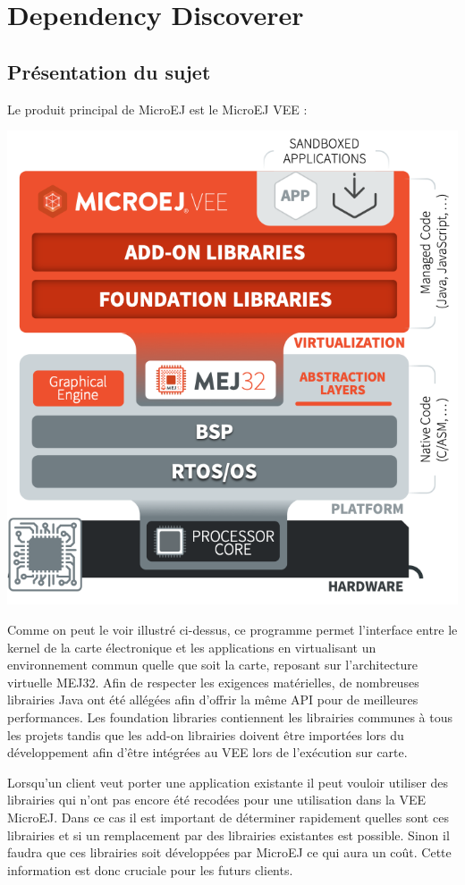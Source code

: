 \documentclass[french,a4paper,12pt]{report}
\begin{document}
\chapter{Dependency Discoverer}

\section{Présentation du sujet}

Le produit principal de MicroEJ est le MicroEJ VEE :

\begin{center}
  \includegraphics[width=.6\textwidth]{ressources/schemas/Implementations-on-hardware_minimize.png}
\end{center}

Comme on peut le voir illustré ci-dessus, ce programme permet l’interface entre le kernel de la carte électronique et les applications en virtualisant un environnement commun quelle que soit la carte, reposant sur l’architecture virtuelle MEJ32. Afin de respecter les exigences matérielles, de nombreuses librairies Java ont été allégées afin d’offrir la même API pour de meilleures performances. Les foundation libraries contiennent les librairies communes à tous les projets tandis que les add-on librairies doivent être importées lors du développement afin d’être intégrées au VEE lors de l’exécution sur carte.

Lorsqu’un client veut porter une application existante il peut vouloir utiliser des librairies qui n’ont pas encore été recodées pour une utilisation dans la VEE MicroEJ. Dans ce cas il est important de déterminer rapidement quelles sont ces librairies et si un remplacement par des librairies existantes est possible. Sinon il faudra que ces librairies soit développées par MicroEJ ce qui aura un coût. Cette information est donc cruciale pour les futurs clients.
 
\end{document}
